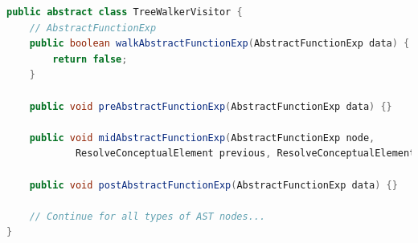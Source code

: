 \documentclass[times]{speauth}
\begin{document}
\begin{lstlisting}[language=java,caption={TreeWalkerVisitor.java}]
public abstract class TreeWalkerVisitor {
    // AbstractFunctionExp
    public boolean walkAbstractFunctionExp(AbstractFunctionExp data) {
        return false;
    }

    public void preAbstractFunctionExp(AbstractFunctionExp data) {}

    public void midAbstractFunctionExp(AbstractFunctionExp node,
            ResolveConceptualElement previous, ResolveConceptualElement next) {}

    public void postAbstractFunctionExp(AbstractFunctionExp data) {}
    
    // Continue for all types of AST nodes... 
}

\end{lstlisting}
\end{document}
